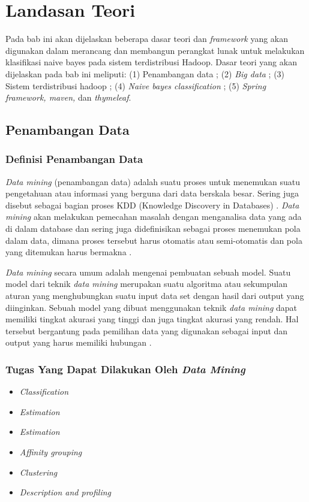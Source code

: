 \chapter{Landasan Teori}

Pada bab ini akan dijelaskan beberapa dasar teori dan \textit{framework} yang akan digunakan dalam merancang dan membangun perangkat lunak untuk melakukan klasifikasi naive bayes pada sistem terdistribusi Hadoop. Dasar teori yang akan dijelaskan pada bab ini meliputi: (1) Penambangan data ; (2) \textit{Big data} ; (3) Sistem terdistribusi hadoop ; (4) \textit{Naive bayes classification} ; (5) \textit{Spring framework, maven, } dan \textit{thymeleaf}. \\

\section{Penambangan Data}

\subsection{Definisi Penambangan Data}
\textit{Data mining} (penambangan data) adalah suatu proses untuk menemukan suatu
pengetahuan atau informasi yang berguna dari data berskala besar. Sering juga
disebut sebagai bagian proses KDD (Knowledge Discovery in Databases) \cite{Piateski:1991:KDD:583310}. \textit{Data mining} akan melakukan pemecahan masalah dengan menganalisa data yang ada di dalam database dan sering juga didefinisikan sebagai proses menemukan pola dalam data, dimana proses tersebut harus otomatis atau semi-otomatis dan pola yang ditemukan harus bermakna \cite{DataMiningIntro:2015}.

\textit{Data mining} secara umum adalah mengenai pembuatan sebuah model. Suatu model dari teknik \textit{data mining} merupakan suatu algoritma atau sekumpulan aturan yang menghubungkan suatu input data set dengan hasil dari output yang diinginkan. Sebuah model yang dibuat menggunakan teknik \textit{data mining} dapat memiliki tingkat akurasi yang tinggi dan juga tingkat akurasi yang rendah. Hal tersebut bergantung pada pemilihan data yang digunakan sebagai input dan output yang harus memiliki hubungan \cite{book:339389}.

\subsection{Tugas Yang Dapat Dilakukan Oleh \textit{Data Mining}}
\begin{itemize}
	\item \textit{Classification}
	\item \textit{Estimation}
	\item \textit{Estimation}
	\item \textit{Affinity grouping}
	\item \textit{Clustering}
	\item \textit{Description and profiling}
\end{itemize}


